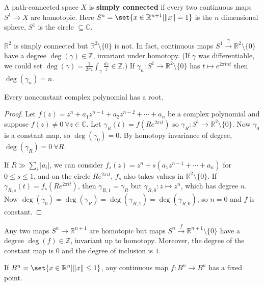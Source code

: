 \documentclass{article}
\begin{document}
\begin{defi}
  A path-connected space $X$ is \textbf{simply connected} if every two continuous maps $S^1 \to X$ are homotopic.
  Here $S^n = \set{x \in \mathbb{R}^{n+1} | \|x\| = 1}$ is the $n$ dimensional sphere, $S^1$ is the circle $\subseteq \mathbb{C}$.
\end{defi}
\begin{eg}
  $\mathbb{R}^2$ is simply connected but $\mathbb{R}^2 \setminus \{0\}$ is not. In fact, continuous maps $S^1 \xrightarrow{\gamma} \mathbb{R}^2 \setminus \{0\}$ have a degree $\deg(\gamma) \in \mathbb{Z}$, invariant under homotopy.
  (If $\gamma$ was differentiable, we could set $\deg(\gamma) = \frac{1}{2\pi i} \int_\gamma \frac{dz}{z} \in \mathbb{Z}$.)
  If $\gamma_n: S^1 \to \mathbb{R}^2 \setminus \{0\}$ has $t \mapsto e^{2\pi int}$ then $\deg(\gamma_n) = n$.
\end{eg}
\begin{cor}
  Every nonconstant complex polynomial has a root.
\end{cor}
\begin{proof}
  Let $f(z) = z^n + a_1 z^{n-1} + a_2 z^{n-2} + \dotsb + a_n$ be a complex polynomial and suppose $f(z) \neq 0 \ \forall z \in \mathbb{C}$. Let $\gamma_R(t) = f(R e^{2\pi it})$ so $\gamma_R : S^1 \to \mathbb{R}^2 \setminus \{0\}$.
  Now $\gamma_0$ is a constant map, so $\deg(\gamma_0) = 0$. By homotopy invariance of degree, $\deg(\gamma_R) = 0 \ \forall R$.

  If $R \gg \sum_i |a_i|$, we can consider $f_s(z) = z^n + s(a_1 z^{n-1} + \dotsb + a_n)$ for $0 \leq s \leq 1$, and on the circle $R e^{2\pi i t}$, $f_s$ also takes values in $\mathbb{R}^2 \setminus \{0\}$.
  If $\gamma_{R,s}(t) = f_s(R e^{2 \pi i t})$, then $\gamma_{R,1} = \gamma_R$ but $\gamma_{R,0} : z \mapsto z^n$, which has degree $n$.
  Now $\deg(\gamma_0) = \deg(\gamma_R) = \deg(\gamma_{R,1}) = \deg(\gamma_{R,0})$, so $n=0$ and $f$ is constant.
\end{proof}
\begin{fact}
  Any two maps $S^n \to \mathbb{R}^{n+1}$ are homotopic but maps $S^n \xrightarrow{f} \mathbb{R}^{n+1} \setminus \{0\}$ have a degree $\deg(f) \in \mathbb{Z}$, invariant up to homotopy.
  Moreover, the degree of the constant map is $0$ and the degree of inclusion is $1$.
\end{fact}
\begin{cor}
  If $B^n = \set{x \in \mathbb{R}^n | \|x\| \leq 1}$, any continuous map $f: B^n \to B^n$ has a fixed point.
\end{cor}
\end{document}
